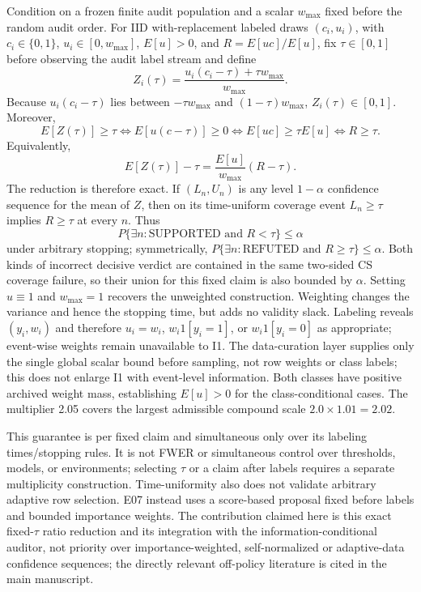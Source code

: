 \documentclass[11pt,a4paper]{article}
\begin{document}
Condition on a frozen finite audit population and a scalar $w_{\max}$ fixed
before the random audit order. For IID with-replacement labeled draws
$(c_i,u_i)$, with $c_i\in\{0,1\}$, $u_i\in[0,w_{\max}]$, $E[u]>0$, and
$R=E[uc]/E[u]$, fix $\tau\in[0,1]$ before observing the audit label stream and define
\[
 Z_i(\tau)=\frac{u_i(c_i-\tau)+\tau w_{\max}}{w_{\max}}.
\]
Because $u_i(c_i-\tau)$ lies between $-\tau w_{\max}$ and
$(1-\tau)w_{\max}$, $Z_i(\tau)\in[0,1]$. Moreover,
\[
 E[Z(\tau)]\geq\tau
 \iff E[u(c-\tau)]\geq0
 \iff E[uc]\geq\tau E[u]
 \iff R\geq\tau.
\]
Equivalently,
\[
 E[Z(\tau)]-\tau=\frac{E[u]}{w_{\max}}(R-\tau).
\]
The reduction is therefore exact. If $(L_n,U_n)$ is any level
$1-\alpha$ confidence sequence for the mean of $Z$, then on its
time-uniform coverage event $L_n\geq\tau$ implies $R\geq\tau$ at every
$n$. Thus
\[
 P\{\exists n:\text{SUPPORTED and }R<\tau\}\leq\alpha
\]
under arbitrary stopping; symmetrically,
$P\{\exists n:\text{REFUTED and }R\geq\tau\}\leq\alpha$. Both kinds of
incorrect decisive verdict are contained in the same two-sided CS coverage
failure, so their union for this fixed claim is also bounded by $\alpha$.
Setting $u\equiv1$ and $w_{\max}=1$ recovers
the unweighted construction. Weighting changes the variance and hence
the stopping time, but adds no validity slack. Labeling reveals $(y_i,w_i)$
and therefore $u_i=w_i$, $w_i1[y_i=1]$, or $w_i1[y_i=0]$ as appropriate;
event-wise weights remain unavailable to I1. The data-curation layer supplies
only the single global scalar bound before sampling, not row weights or class
labels; this does not enlarge I1 with event-level information. Both classes have positive
archived weight mass, establishing $E[u]>0$ for the class-conditional cases.
The multiplier 2.05 covers the largest admissible compound scale
$2.0\times1.01=2.02$.

This guarantee is per fixed claim and simultaneous only over its labeling
times/stopping rules. It is not FWER or simultaneous control over thresholds,
models, or environments; selecting $\tau$ or a claim after labels requires a
separate multiplicity construction. Time-uniformity also does not validate
arbitrary adaptive row selection. E07 instead uses a score-based proposal
fixed before labels and bounded importance weights.
The contribution claimed here is this exact fixed-$\tau$ ratio reduction and
its integration with the information-conditional auditor, not priority over
importance-weighted, self-normalized or adaptive-data confidence sequences;
the directly relevant off-policy literature is cited in the main manuscript.
\end{document}
